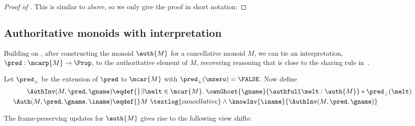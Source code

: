 \begin{proof}[Proof of ]
This is similar to above, so we only give the proof in short notation:

\end{proof}

\subsection{Authoritative monoids with interpretation}\label{sec:authinterp}

Building on , after constructing the monoid $\auth{M}$ for a cancellative monoid $M$, we can tie an interpretation, $\pred : \mcarp{M} \to \Prop$, to the authoritative element of $M$, recovering reasoning that is close to the sharing rule in~\cite{krishnaswami+:icfp12}.

Let $\pred_\bot$ be the extension of $\pred$ to $\mcar{M}$ with $\pred_\bot(\mzero) = \FALSE$.
Now define
\begin{align*}
  \AuthInv(M, \pred, \gname) \eqdef{}& \exists \melt \in \mcar{M}.\; \ownGhost{\gname}{\authfull \melt:\auth{M}} * \pred_\bot(\melt) \\
  \Auth(M, \pred, \gname, \iname) \eqdef{}& M~\textlog{cancellative} \land \knowInv{\iname}{\AuthInv(M, \pred, \gname)}
\end{align*}

The frame-preserving updates for $\auth{M}$ gives rise to the following view shifts:

